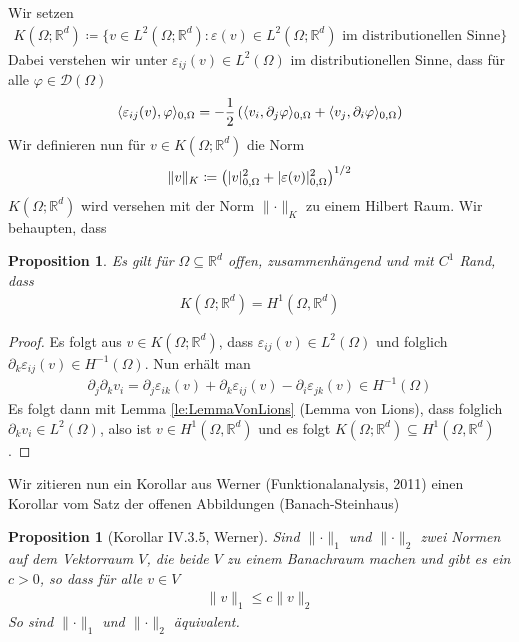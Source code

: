 \documentclass{scrartcl}
\newcounter{everything}
\newtheorem{proposition}[everything]{Proposition}
\def\R{\mathbb{R}}
\def\e{\varepsilon}
\newcommand{\cD}{\mathcal{D}}
\newcommand{\norm}[1]{\lVert #1 \rVert}
\DeclarePairedDelimiter{\abs}{|}{|}
\DeclarePairedDelimiter{\inner}{\langle}{\rangle}
\begin{document}
\newpage

Wir setzen
\begin{align*}
	K(\Omega;\R^d)\coloneqq\{v\in L^2(\Omega;\R^d)\colon \e(v)\in L^2(\Omega;\R^d) \text{ im distributionellen Sinne}\}
\end{align*}
Dabei verstehen wir unter $\e_{ij}(v)\in L^2(\Omega)$ im distributionellen Sinne, dass für alle $\varphi\in\cD(\Omega)$
\begin{align*}
	\inner{\e_{ij}(v),\varphi}_{0,\Omega}= -\frac{1}{2}\left(\inner{v_i,\partial_j\varphi}_{0,\Omega}+\inner{v_j,\partial_i\varphi}_{0,\Omega}\right)
\end{align*}
Wir definieren nun für $v\in K(\Omega;\R^d)$ die Norm
\begin{align*}
	\norm{v}_K\coloneqq \left(\abs{v}_{0,\Omega}^2+\abs{\e(v)}_{0,\Omega}^2\right)^{1/2}
\end{align*}
$K(\Omega;\R^d)$ wird versehen mit der Norm $\norm{\cdot}_K$ zu einem Hilbert Raum.	
Wir behaupten, dass
\begin{proposition}
	Es gilt für $\Omega\subseteq\R^d$ offen, zusammenhängend und mit $C^1$ Rand, dass
	\begin{align*}
		K(\Omega;\R^d) =H^1(\Omega,\R^d)
	\end{align*}
\end{proposition}
\begin{proof}
	Es folgt aus $v\in K(\Omega;\R^d)$, dass $\e_{ij}(v)\in L^2(\Omega)$ und folglich $\partial_k\e_{ij}(v)\in H^{-1}(\Omega)$. Nun erhält man
	\begin{align*}
		\partial_j\partial_kv_i = \partial_j\e_{ik}(v)+\partial_k\e_{ij}(v)-\partial_i\e_{jk}(v)\in H^{-1}(\Omega)
	\end{align*}
	Es folgt dann mit Lemma \ref{le:LemmaVonLions} (Lemma von Lions), dass folglich $\partial_kv_i\in L^2(\Omega)$, also ist $v\in H^1(\Omega,\R^d)$ und es folgt $K(\Omega;\R^d)\subseteq H^1(\Omega,\R^d)$.
\end{proof}

Wir zitieren nun ein Korollar aus Werner (Funktionalanalysis, 2011) einen Korollar vom Satz der offenen Abbildungen (Banach-Steinhaus)
\begin{proposition}[Korollar IV.3.5, Werner]
	Sind $\norm{\cdot}_1$ und $\norm{\cdot}_2$ zwei Normen auf dem Vektorraum $V$, die beide $V$ zu einem Banachraum machen und gibt es ein $c>0$, so dass für alle $v\in V$
	\begin{align*}
		\norm{v}_1\leq c\norm{v}_2
	\end{align*}
	So sind $\norm{\cdot}_1$ und $\norm{\cdot}_2$ äquivalent.
\end{proposition}
\end{document}
